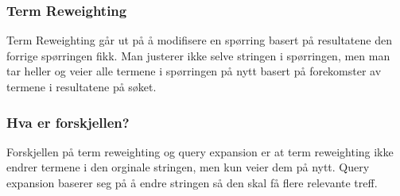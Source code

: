 \subsubsection*{Term Reweighting}
Term Reweighting går ut på å modifisere en spørring basert på resultatene den forrige spørringen fikk. Man justerer ikke selve stringen i spørringen, men man tar heller og veier alle termene i spørringen på nytt basert på forekomster av termene i resultatene på søket.
\subsubsection*{Hva er forskjellen?}
Forskjellen på term reweighting og query expansion er at term reweighting ikke endrer termene i den orginale stringen, men kun veier dem på nytt. Query expansion baserer seg på å endre stringen så den skal få flere relevante treff.

